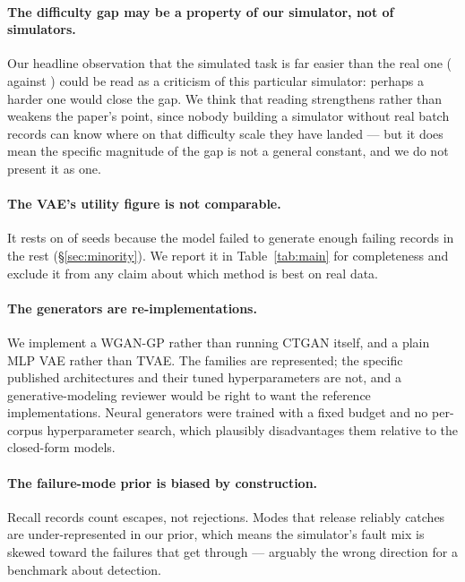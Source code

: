 \documentclass[11pt]{article}
\begin{document}
\paragraph{The difficulty gap may be a property of our simulator, not of
simulators.} Our headline observation that the simulated task is far easier than
the real one (\trtrAuprcSim{} against \trtrAuprcReal{}) could be read as a
criticism of this particular simulator: perhaps a harder one would close the gap.
We think that reading strengthens rather than weakens the paper's point, since
nobody building a simulator without real batch records can know where on that
difficulty scale they have landed --- but it does mean the specific magnitude of
the gap is not a general constant, and we do not present it as one.

\paragraph{The VAE's utility figure is not comparable.} It rests on
\vaeDegenRealSeeds{} of \nSeeds{} seeds because the model failed to generate
enough failing records in the rest (\S\ref{sec:minority}). We report it in
Table~\ref{tab:main} for completeness and exclude it from any claim about which
method is best on real data.

\paragraph{The generators are re-implementations.} We implement a WGAN-GP rather
than running CTGAN itself, and a plain MLP VAE rather than TVAE. The families are
represented; the specific published architectures and their tuned
hyperparameters are not, and a generative-modeling reviewer would be right to
want the reference implementations. Neural generators were trained with a fixed
budget and no per-corpus hyperparameter search, which plausibly disadvantages
them relative to the closed-form models.

\paragraph{The failure-mode prior is biased by construction.} Recall records
count escapes, not rejections. Modes that release reliably catches are
under-represented in our prior, which means the simulator's fault mix is skewed
toward the failures that get through --- arguably the wrong direction for a
benchmark about detection.
\end{document}
